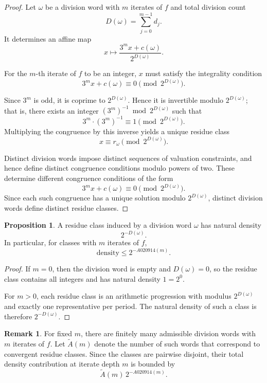 \documentclass[12pt, oneside]{article}   	%
\numberwithin{equation}{section}          %
\theoremstyle{definition}
\newtheorem{proposition}{Proposition}[section]
\newtheorem*{remark}{Remark}
\begin{document}
\begin{proof}
Let \(\omega\) be a division word with $m$ iterates of $f$ and total division count
\[
D(\omega) = \sum_{j=0}^{m-1} d_j.
\]
It determines an affine map
\[
x \longmapsto \frac{3^m x + c(\omega)}{2^{D(\omega)}}.
\]

For the $m$-th iterate of $f$ to be an integer, $x$ must satisfy the
integrality condition
\[
3^m x + c(\omega) \equiv 0 \pmod{2^{D(\omega)}}.
\]

Since \(3^m\) is odd, it is coprime to \(2^{D(\omega)}\).  
Hence it is invertible modulo \(2^{D(\omega)}\); that is, there exists an integer
\((3^m)^{-1} \bmod 2^{D(\omega)}\) such that
\[
3^m \cdot (3^m)^{-1} \equiv 1 \pmod{2^{D(\omega)}}.
\] 
Multiplying the congruence by this inverse yields a unique residue class
\[
x \equiv r_\omega \pmod{2^{D(\omega)}}.
\]

Distinct division words impose distinct sequences of valuation constraints,
and hence define distinct congruence conditions modulo powers of two. These
determine different congruence conditions of the form
\[
3^m x + c(\omega) \equiv 0 \pmod{2^{D(\omega)}}.
\]
Since each such congruence has a unique solution modulo $2^{D(\omega)}$,
distinct division words define distinct residue classes.
\end{proof}

\begin{proposition}
A residue class induced by a division word $\omega$ has natural density
\[
2^{-D(\omega)}.
\]
In particular, for classes with $m$ iterates of $f$,
\[
\text{density} \le 2^{-A020914(m)}.
\]
\end{proposition}

\begin{proof}
If $m=0$, then the division word is empty and $D(\omega)=0$, so the residue class
contains all integers and has natural density $1 = 2^0$.

For $m>0$, each residue class is an arithmetic progression with modulus $2^{D(\omega)}$
and exactly one representative per period. The natural density of such a class
is therefore $2^{-D(\omega)}$.
\end{proof}

\begin{remark}
For fixed $m$, there are finitely many admissible division words with $m$ iterates
of $f$. Let $\widetilde A(m)$ denote the number of such words that correspond to
convergent residue classes. Since the classes are pairwise disjoint, their
total density contribution at iterate depth $m$ is bounded by
\[
\widetilde A(m)\,2^{-A020914(m)}.
\]
\end{remark}
\end{document}
